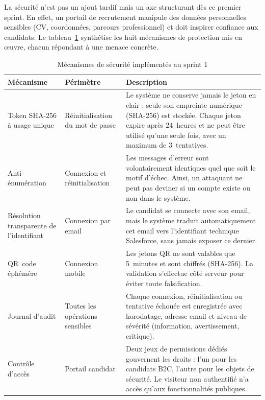 La sécurité n'est pas un ajout tardif mais un axe structurant dès ce premier sprint. En effet, un portail de recrutement manipule des données personnelles sensibles (CV, coordonnées, parcours professionnel) et doit inspirer confiance aux candidats. Le tableau~\ref{tab:securite_sprint1} synthétise les huit mécanismes de protection mis en \oe{}uvre, chacun répondant à une menace concrète.

\begin{longtable}{|p{4cm}|p{4cm}|p{6.5cm}|}
\caption{Mécanismes de sécurité implémentés au sprint 1} \label{tab:securite_sprint1} \\
\hline
\rowcolor{gray!20} \textbf{Mécanisme} & \textbf{Périmètre} & \textbf{Description} \\
\hline
\endfirsthead
\endhead

Token SHA-256 à usage unique & Réinitialisation du mot de passe & Le système ne conserve jamais le jeton en clair : seule son empreinte numérique (SHA-256) est stockée. Chaque jeton expire après 24~heures et ne peut être utilisé qu'une seule fois, avec un maximum de 3~tentatives. \\
\hline

Anti-énumération & Connexion et réinitialisation & Les messages d'erreur sont volontairement identiques quel que soit le motif d'échec. Ainsi, un attaquant ne peut pas deviner si un compte existe ou non dans le système. \\
\hline

Résolution transparente de l'identifiant & Connexion par email & Le candidat se connecte avec son email, mais le système traduit automatiquement cet email vers l'identifiant technique Salesforce, sans jamais exposer ce dernier. \\
\hline

QR~code éphémère & Connexion mobile & Les jetons QR ne sont valables que 5~minutes et sont chiffrés (SHA-256). La validation s'effectue côté serveur pour éviter toute falsification. \\
\hline

Journal d'audit & Toutes les opérations sensibles & Chaque connexion, réinitialisation ou tentative échouée est enregistrée avec horodatage, adresse email et niveau de sévérité (information, avertissement, critique). \\
\hline

Contrôle d'accès & Portail candidat & Deux jeux de permissions dédiés gouvernent les droits : l'un pour les candidats B2C, l'autre pour les objets de sécurité. Le visiteur non authentifié n'a accès qu'aux fonctionnalités publiques. \\
\hline


\end{longtable}
